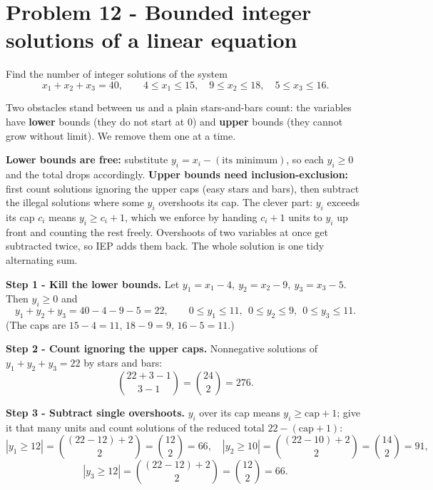 \documentclass[11pt,a4paper]{article}
\begin{document}
\section*{Problem 12 - Bounded integer solutions of a linear equation}

\begin{problembox}[12]
Find the number of integer solutions of the system
$$x_1+x_2+x_3=40,\qquad 4\le x_1\le 15,\quad 9\le x_2\le 18,\quad 5\le x_3\le 16.$$
\end{problembox}

\begin{ideabox}
Two obstacles stand between us and a plain stars-and-bars count: the variables have \textbf{lower}
bounds (they do not start at $0$) and \textbf{upper} bounds (they cannot grow without limit). We
remove them one at a time.

\textbf{Lower bounds are free:} substitute $y_i=x_i-(\text{its minimum})$, so each $y_i\ge 0$ and the
total drops accordingly. \textbf{Upper bounds need inclusion-exclusion:} first count solutions
ignoring the upper caps (easy stars and bars), then subtract the \textquotedbl{}illegal\textquotedbl{}
solutions where some $y_i$ overshoots its cap. The clever part: \textquotedbl{}$y_i$ exceeds its cap
$c_i$\textquotedbl{} means \textquotedbl{}$y_i\ge c_i+1$\textquotedbl{}, which we enforce by handing
$c_i+1$ units to $y_i$ up front and counting the rest freely. Overshoots of two variables at once get
subtracted twice, so IEP adds them back. The whole solution is one tidy alternating sum.
\end{ideabox}

\textbf{Step 1 - Kill the lower bounds.}
Let $y_1=x_1-4,\ y_2=x_2-9,\ y_3=x_3-5$. Then $y_i\ge 0$ and
$$y_1+y_2+y_3=40-4-9-5=22,\qquad 0\le y_1\le 11,\ \ 0\le y_2\le 9,\ \ 0\le y_3\le 11.$$
(The caps are $15-4=11$, $18-9=9$, $16-5=11$.)

\textbf{Step 2 - Count ignoring the upper caps.}
Nonnegative solutions of $y_1+y_2+y_3=22$ by stars and bars:
$$\binom{22+3-1}{3-1}=\binom{24}{2}=276.$$

\textbf{Step 3 - Subtract single overshoots.}
\textquotedbl{}$y_i$ over its cap\textquotedbl{} means $y_i\ge \text{cap}+1$; give it that many units
and count solutions of the reduced total $22-(\text{cap}+1)$:
$$|y_1\ge 12|=\binom{(22-12)+2}{2}=\binom{12}{2}=66,\quad
  |y_2\ge 10|=\binom{(22-10)+2}{2}=\binom{14}{2}=91,$$
$$|y_3\ge 12|=\binom{(22-12)+2}{2}=\binom{12}{2}=66.$$
\end{document}
